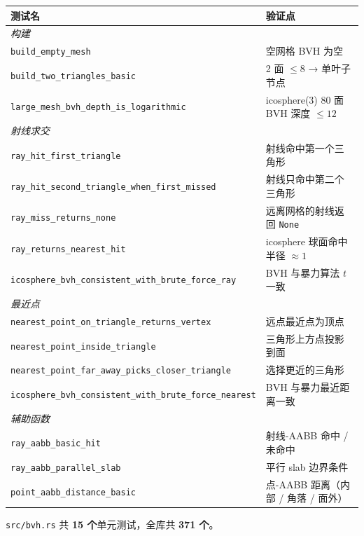 \documentclass[11pt,a4paper]{article}
\begin{document}
\begin{center}
\renewcommand{\arraystretch}{1.18}
\begin{tabular}{@{}ll@{}}
  \toprule
  \textbf{测试名} & \textbf{验证点} \\
  \midrule
  \multicolumn{2}{l}{\textit{构建}} \\
  \texttt{build\_empty\_mesh}                         & 空网格 BVH 为空 \\
  \texttt{build\_two\_triangles\_basic}               & 2 面 $\le 8$ → 单叶子节点 \\
  \texttt{large\_mesh\_bvh\_depth\_is\_logarithmic}   & icosphere(3) 80 面 BVH 深度 $\le 12$ \\
  \midrule
  \multicolumn{2}{l}{\textit{射线求交}} \\
  \texttt{ray\_hit\_first\_triangle}                  & 射线命中第一个三角形 \\
  \texttt{ray\_hit\_second\_triangle\_when\_first\_missed} & 射线只命中第二个三角形 \\
  \texttt{ray\_miss\_returns\_none}                   & 远离网格的射线返回 \texttt{None} \\
  \texttt{ray\_returns\_nearest\_hit}                 & icosphere 球面命中半径 $\approx 1$ \\
  \texttt{icosphere\_bvh\_consistent\_with\_brute\_force\_ray} & BVH 与暴力算法 $t$ 一致 \\
  \midrule
  \multicolumn{2}{l}{\textit{最近点}} \\
  \texttt{nearest\_point\_on\_triangle\_returns\_vertex} & 远点最近点为顶点 \\
  \texttt{nearest\_point\_inside\_triangle}           & 三角形上方点投影到面 \\
  \texttt{nearest\_point\_far\_away\_picks\_closer\_triangle} & 选择更近的三角形 \\
  \texttt{icosphere\_bvh\_consistent\_with\_brute\_force\_nearest} & BVH 与暴力最近距离一致 \\
  \midrule
  \multicolumn{2}{l}{\textit{辅助函数}} \\
  \texttt{ray\_aabb\_basic\_hit}                      & 射线-AABB 命中 / 未命中 \\
  \texttt{ray\_aabb\_parallel\_slab}                  & 平行 slab 边界条件 \\
  \texttt{point\_aabb\_distance\_basic}               & 点-AABB 距离（内部 / 角落 / 面外） \\
  \bottomrule
\end{tabular}
\end{center}

\texttt{src/bvh.rs} 共 \textbf{15 个}单元测试，全库共 \textbf{371 个}。
\end{document}
